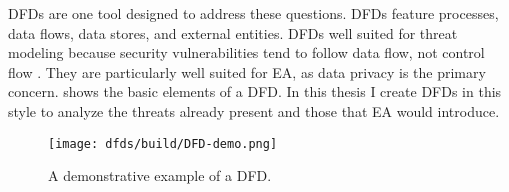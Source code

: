 \Acp{DFD} are one tool designed to address these questions. \Acp{DFD} feature processes, data flows, data stores, and
external entities. \Acp{DFD} well suited for threat modeling because security vulnerabilities tend to follow data flow,
not control flow \cite{shostack_threat_2014}. They are particularly well suited for \ac{EA}, as data privacy is the
primary concern.  shows the basic elements of a \ac{DFD}. In this thesis I create \acp{DFD} in this
style to analyze the threats already present and those that \ac{EA} would introduce.

\begin{figure}[ht]
    \centering\CaptionFontSize
    \texttt{[image: dfds/build/DFD-demo.png]}
    \caption[\Acs{DFD} Demo]{A demonstrative example of a \acf{DFD}.}
    \label{fig-dfd-demo}
\end{figure}
